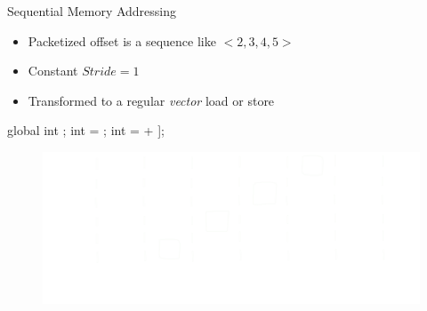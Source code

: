 \begin{frame}[fragile]{Sequential Memory Addressing}

\begin{itemize}
    \item Packetized offset is a sequence like $<2, 3, 4, 5>$
    \item Constant $Stride = 1$
    \item Transformed to a regular \emph{vector} load or store
\end{itemize}

\begin{minipage}[t]{0.40\linewidth}
    \vspace{0.1ex}
    \begin{codebox}[commandchars=\\\[\]]

global int \uniform[*src];
int \varying[tid] = ;
int \varying[x] = \uniform[src]\idx[\varying[tid] + \uniform[2]];





    \end{codebox}
\end{minipage}
\hspace{2em}
\begin{minipage}[t]{0.49\linewidth}
    \vspace{0.6ex}
    \begin{figure}
        \includegraphics[width=1.0\textwidth]{images/sequential-access.pdf}
    \end{figure}
\end{minipage}

\end{frame}


